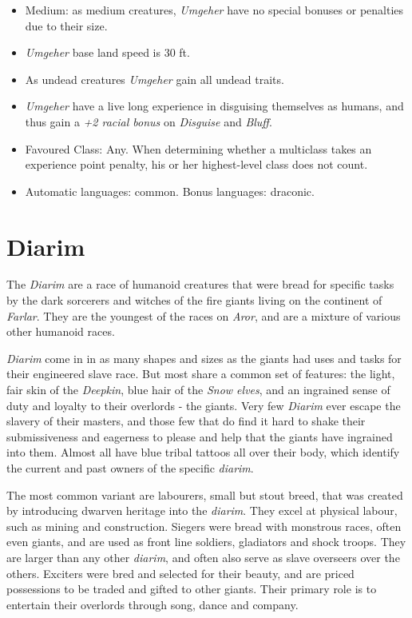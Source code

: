 \begin{35e}
  \begin{itemize}[noitemsep]
    \item Medium: as medium creatures, \emph{Umgeher} have no special bonuses or
    penalties due to their size.
    \item \emph{Umgeher} base land speed is 30 ft.
    \item As undead creatures \emph{Umgeher} gain all undead traits.
    \item \emph{Umgeher} have a live long experience in disguising themselves as
    humans, and thus gain a \emph{+2 racial bonus} on \emph{Disguise} and
    \emph{Bluff}.
    \item Favoured Class: Any. When determining whether a multiclass takes an
    experience point penalty, his or her highest-level class does not count.
    \item Automatic languages: common. Bonus languages: draconic.
  \end{itemize}
\end{35e}

\section*{Diarim}


The \emph{Diarim} are a race of humanoid creatures that were bread for
specific tasks by the dark sorcerers and witches of the fire giants living on
the continent of \emph{Farlar}. They are the youngest of the races
on \emph{Aror}, and are a mixture of various other humanoid races.

\emph{Diarim} come in in as many shapes and sizes as the giants had uses and
tasks for their engineered slave race. But most share a common set of features:
the light, fair skin of the \emph{Deepkin}, blue hair of the \emph{Snow elves},
and an ingrained sense of duty and loyalty to their overlords - the giants. Very
few \emph{Diarim} ever escape the slavery of their masters, and those few that
do find it hard to shake their submissiveness and eagerness to please and help
that the giants have ingrained into them. Almost all have blue tribal tattoos
all over their body, which identify the current and past owners of the specific
\emph{diarim}.

The most common variant are labourers, small but stout breed, that was created
by introducing dwarven heritage into the \emph{diarim}. They excel at physical
labour, such as mining and construction. Siegers were bread with monstrous
races, often even giants, and are used as front line soldiers, gladiators and
shock troops. They are larger than any other \emph{diarim}, and often also
serve as slave overseers over the others. Exciters were bred and selected for
their beauty, and are priced possessions to be traded and gifted to other
giants. Their primary role is to entertain their overlords through song, dance
and company.

